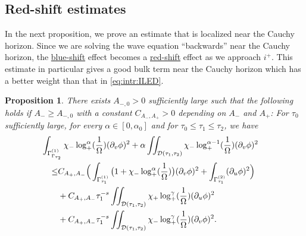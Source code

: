 \documentclass[10pt, reqno]{amsart}
\newtheorem{proposition}[theorem]{Proposition}
\theoremstyle{definition}
\theoremstyle{remark}
\numberwithin{equation}{section}
\newcommand{\rd}{\partial}
\newcommand{\bb}{\Big}
\newcommand{\0}{\emptyset}
\newcommand{\alp}{\alpha}
\newcommand{\Gmm}{\Gamma}
\newcommand{\Omg}{\Omega}
\newcommand{\calD}{\mathcal D}
\newcommand{\f}{\frac}
\begin{document}
\subsection{Red-shift estimates}\label{sec.red.shift}

In the next proposition, we prove an estimate that is localized near the Cauchy horizon. Since we are solving the wave equation ``backwards'' near the Cauchy horizon, the \underline{blue-shift} effect becomes a \underline{red-shift} effect as we approach $i^{+}$. This estimate in particular gives a good bulk term near the Cauchy horizon which has a better weight than that in \eqref{eq:intr:ILED}. 
\begin{proposition} \label{prop:intr:red-shift}  
There exists $A_{-,0}>0$ sufficiently large such that the following holds if $A_-\geq A_{-,0}$ with a constant $C_{A_-,A_+}>0$ depending on $A_-$ and $A_+$: For $\tau_0$ sufficiently large, for every $\alp \in [0,\alp_0]$ and for $\tau_0 \leq \tau_{1} \leq \tau_{2}$, we have
\begin{equation} \label{eq:intr:red-shift}
\begin{aligned}
& \hskip-2em
	\int_{\Gmm^{(1)}_{\Gmm_{\tau_{2}}}} \chi_{-} \log_+^{\alp} (\frac{1}{\Omg}) (\rd_{v} \phi)^{2}
	+ \alp \iint_{\calD(\tau_{1}, \tau_{2})} \chi_{-} \log_+^{\alp-1} (\frac{1}{\Omg}) (\rd_{v} \phi)^{2} \\
	\leq & C_{A_+,A_-} \bb( \int_{\Gmm^{(1)}_{\tau_{1}}} \big( 1 + \chi_{-} \log_+^{\alp}(\frac{1}{\Omg}) \big) (\rd_{v} \phi)^{2}
	+ \int_{\Gmm^{(2)}_{\tau_{1}}} (\rd_{u} \phi)^{2} \bb)	\\
	&+C_{A_+,A_-}\tau_1^{-s}\iint_{\calD(\tau_{1}, \tau_{2})} \chi_+\log_+^{\gamma}(\f{1}{\Omg})(\rd_u\phi)^2\\
	&+C_{A_+,A_-}\tau_1^{-s}\iint_{\calD(\tau_{1}, \tau_{2})} \chi_-\log_+^{\gamma}(\f{1}{\Omg})(\rd_v\phi)^2.
\end{aligned}
\end{equation}
\end{proposition}
\end{document}
